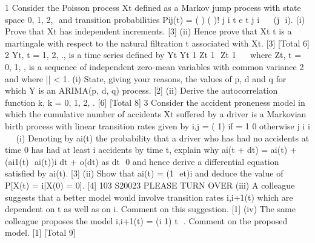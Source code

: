 
1 Consider the Poisson process Xt defined as a Markov jump process with state space
{0, 1, 2, } and transition probabilities
Pij(t) = ( )
( )!
j i
t e t
j i

 

(j  i).
(i) Prove that Xt has independent increments. [3]
(ii) Hence prove that Xt t is a martingale with respect to the natural filtration t
associated with Xt. [3]
[Total 6]
2 Yt, t = 1, 2, ., is a time series defined by
Yt Yt 1 Zt 1  Zt 1  
   
where Zt, t = 0, 1, , is a sequence of independent zero-mean variables with
common variance 2 and where || < 1.
(i) State, giving your reasons, the values of p, d and q for which Y is an
ARIMA(p, d, q) process. [2]
(ii) Derive the autocorrelation function 	k, k = 0, 1, 2, . [6]
[Total 8]
3 Consider the accident proneness model in which the cumulative number of accidents
Xt suffered by a driver is a Markovian birth process with linear transition rates given
by
i,j =
( 1) if = 1
0 otherwise
j i i    
(i) Denoting by ai(t) the probability that a driver who has had no accidents at
time 0 has had at least i accidents by time t, explain why
ai(t + dt) = ai(t) + (ai1(t)  ai(t))i
dt + o(dt)
as dt  0 and hence derive a differential equation satisfied by ai(t). [3]
(ii) Show that
ai(t) = (1  et)i
and deduce the value of P[X(t) = i|X(0) = 0]. [4]
103 S20023 PLEASE TURN OVER
(iii) A colleague suggests that a better model would involve transition rates i,i+1(t)
which are dependent on t as well as on i. Comment on this suggestion. [1]
(iv) The same colleague proposes the model i,i+1(t) = (i 1)
t
 . Comment on the
proposed model. [1]
[Total 9]


